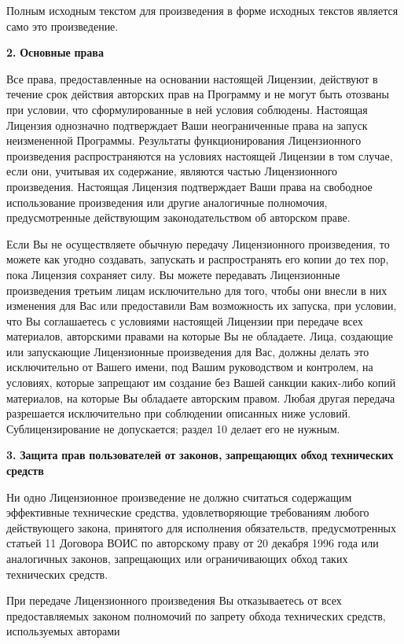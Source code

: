 Полным исходным текстом для произведения в форме исходных текстов является само это произведение.

{\bfseries{2.}} {\bfseries{Основные}} {\bfseries{права}}

Все права, предоставленные на основании настоящей Лицензии, действуют в течение срок действия авторских прав на Программу и не могут быть отозваны при условии, что сформулированные в ней условия соблюдены. Настоящая Лицензия однозначно подтверждает Ваши неограниченные права на запуск неизмененной Программы. Результаты функционирования Лицензионного произведения распространяются на условиях настоящей Лицензии в том случае, если они, учитывая их содержание, являются частью Лицензионного произведения. Настоящая Лицензия подтверждает Ваши права на свободное использование произведения или другие аналогичные полномочия, предусмотренные действующим законодательством об авторском праве.

Если Вы не осуществляете обычную передачу Лицензионного произведения, то можете как угодно создавать, запускать и распространять его копии до тех пор, пока Лицензия сохраняет силу. Вы можете передавать Лицензионные произведения третьим лицам исключительно для того, чтобы они внесли в них изменения для Вас или предоставили Вам возможность их запуска, при условии, что Вы соглашаетесь с условиями настоящей Лицензии при передаче всех материалов, авторскими правами на которые Вы не обладаете. Лица, создающие или запускающие Лицензионные произведения для Вас, должны делать это исключительно от Вашего имени, под Вашим руководством и контролем, на условиях, которые запрещают им создание без Вашей санкции каких-\/либо копий материалов, на которые Вы обладаете авторским правом. Любая другая передача разрешается исключительно при соблюдении описанных ниже условий. Сублицензирование не допускается; раздел 10 делает его не нужным.

{\bfseries{3.}} {\bfseries{Защита}} {\bfseries{прав}} {\bfseries{пользователей}} {\bfseries{от}} {\bfseries{законов,}} {\bfseries{запрещающих}} {\bfseries{обход}} {\bfseries{технических}} {\bfseries{средств}}

Ни одно Лицензионное произведение не должно считаться содержащим эффективные технические средства, удовлетворяющие требованиям любого действующего закона, принятого для исполнения обязательств, предусмотренных статьей 11 Договора ВОИС по авторскому праву от 20 декабря 1996 года или аналогичных законов, запрещающих или ограничивающих обход таких технических средств.

При передаче Лицензионного произведения Вы отказываетесь от всех предоставляемых законом полномочий по запрету обхода технических средств, используемых авторами


